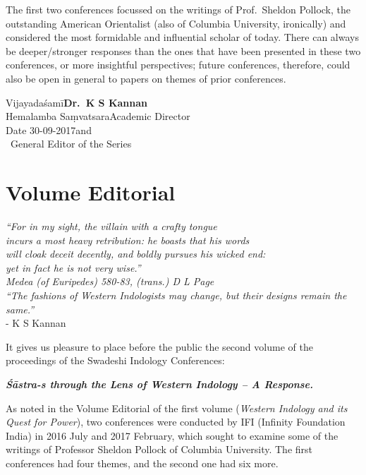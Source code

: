 The first two conferences focussed on the writings of Prof.\ Sheldon Pollock, the outstanding American Orientalist (also of Columbia University, ironically) and considered the most formidable and influential scholar of today. There can always be deeper/stronger responses than the ones that have been presented in these two conferences, or more insightful perspectives; future conferences, therefore, could also be open in general to papers on themes of prior conferences.
\bigskip

\noindent
Vijayadaśamī\hfill	{\bf Dr.~K S Kannan}\\
Hemalamba Saṃvatsara\hfill Academic Director\\
Date 30-09-2017\hfill and\\	
\phantom{.}~\hfill General Editor of the Series                  
               

\chapter*{Volume Editorial}\label{editorial}

\vskip 9pt

\begin{flushright}
{{\sl “For in my sight, the villain with a crafty tongue}}\\
{\sl incurs a most heavy retribution: he boasts that his words}\\
{\sl will cloak deceit decently, and boldly pursues his wicked end:}\\
{\sl yet in fact he is not very wise.”}\\
{\sl Medea (of Euripedes) 580-83, (trans.) D L Page}\\[5pt]
{\sl “The fashions of Western Indologists may change, but their designs remain the same.”}\\[7pt]
- K S Kannan
\end{flushright}

It gives us pleasure to place before the public the second volume of the proceedings of the Swadeshi Indology Conferences:  


{\sl\bfseries Śāstra-s through the Lens of Western Indology -- A Response.}

As noted in the Volume Editorial of the first volume ({\sl Western Indology and its Quest for Power}), two conferences were conducted by IFI (Infinity Foundation India) in 2016 July and 2017 February, which sought to examine some of the writings of Professor Sheldon Pollock of Columbia University. The first conferences had four themes, and the second one had six more. 

